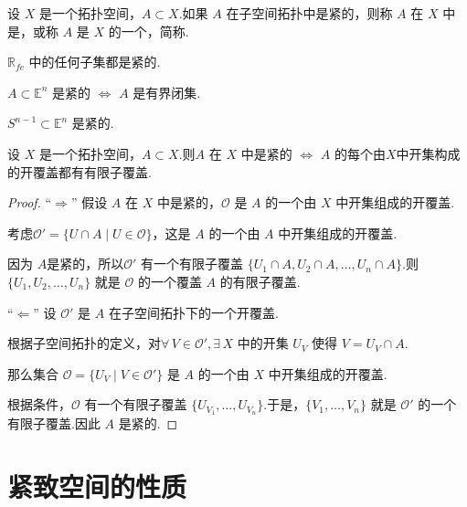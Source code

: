 \begin{definition}[紧致子集][def:6.4]
    设 $X$ 是一个拓扑空间，$A \subset X$.如果 $A$ 在子空间拓扑中是紧的，则称 $A$ 在 $X$ 中是，或称 $A$ 是 $X$ 的一个，简称.
\end{definition}

\begin{instance}
    $\mathbb{R}_{fc}$ 中的任何子集都是紧的.
\end{instance}

\begin{instance}
    $A \subset \mathbb{E}^n$ 是紧的 $\iff$ $A$ 是有界闭集.
\end{instance}

\begin{instance}
    $S^{n-1} \subset \mathbb{E}^n$ 是紧的.
\end{instance}

\begin{lemma}[子空间紧性的等价描述][lem:6.1]
    设 $X$ 是一个拓扑空间，$A \subset X$.则$A$ 在 $X$ 中是紧的 $\iff$ $A$ 的每个由$X$中开集构成的开覆盖都有有限子覆盖.
\end{lemma}
\begin{proof}
    “$\Rightarrow$” 假设 $A$ 在 $X$ 中是紧的，$\mathcal{O}$ 是 $A$ 的一个由 $X$ 中开集组成的开覆盖.\par
    考虑$\mathcal{O}' = \{U \cap A \mid U \in \mathcal{O}\}$，这是 $A$ 的一个由 $A$ 中开集组成的开覆盖.\par
    因为 $A$是紧的，所以$\mathcal{O}'$ 有一个有限子覆盖 $\{U_1 \cap A, U_2 \cap A, \dots, U_n \cap A\}$.则$\{U_1, U_2, \dots, U_n\}$ 就是 $\mathcal{O}$ 的一个覆盖 $A$ 的有限子覆盖.

    “$\Leftarrow$” 设 $\mathcal{O}'$ 是 $A$ 在子空间拓扑下的一个开覆盖.\par
    根据子空间拓扑的定义，对$\forall\,V \in \mathcal{O}',\exists\, X$ 中的开集 $U_V$ 使得 $V = U_V \cap A$.\par
    那么集合 $\mathcal{O} = \{U_V \mid V \in \mathcal{O}'\}$ 是 $A$ 的一个由 $X$ 中开集组成的开覆盖.\par
    根据条件，$\mathcal{O}$ 有一个有限子覆盖 $\{U_{V_1}, \dots, U_{V_n}\}$.于是，$\{V_1, \dots, V_n\}$ 就是 $\mathcal{O}'$ 的一个有限子覆盖.因此 $A$ 是紧的.
\end{proof}


\section{紧致空间的性质}

